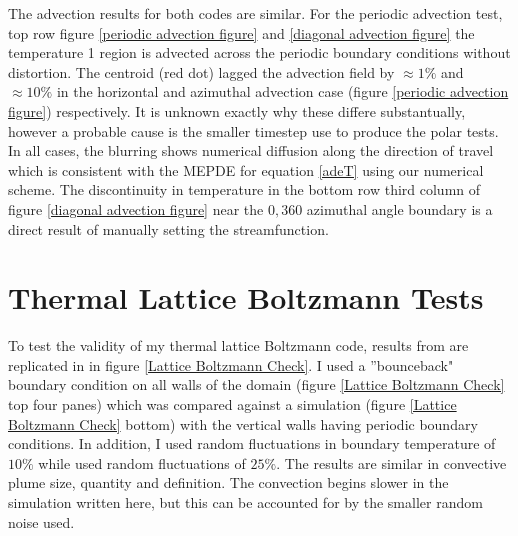\documentclass{article}
\begin{document}
\noindent The advection results for both codes are similar. For the periodic advection test, top row figure \ref{periodic advection figure} and \ref{diagonal advection figure} the temperature 1 region is advected across the periodic boundary conditions without distortion. The centroid (red dot) lagged the advection field by $\approx 1 \%$ and $\approx 10 \%$ in the horizontal and azimuthal advection case (figure \ref{periodic advection figure}) respectively. It is unknown exactly why these differe substantually, however a probable cause is the smaller timestep use to produce the polar tests. In all cases, the blurring shows numerical diffusion along the direction of travel which is consistent with the MEPDE for equation \ref{adeT} using our numerical scheme. The discontinuity in temperature in the bottom row third column of figure \ref{diagonal advection figure} near the $0, 360$ azimuthal angle boundary is a direct result of manually setting the streamfunction.

\section*{Thermal Lattice Boltzmann Tests}
To test the validity of my thermal lattice Boltzmann code, results from  \cite{mora2017simulation} are replicated in in figure \ref{Lattice Boltzmann 
Check}. I used a ''bounceback" boundary condition on all walls of the domain (figure \ref{Lattice Boltzmann Check} top four panes) which was compared 
against a simulation (figure \ref{Lattice Boltzmann Check} bottom) with the vertical walls having periodic boundary conditions. In addition, I used 
random fluctuations in boundary temperature of $10 \%$ while \cite{mora2017simulation} used random fluctuations of $25 \%$. The results are similar in 
convective plume size, quantity and definition. The convection begins slower in the simulation written here, but this can be accounted for by the smaller 
random noise used.
\end{document}
